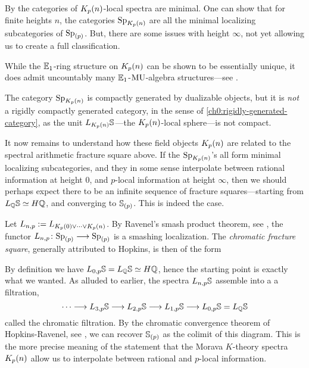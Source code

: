 \begin{remark}
    By \cite[7.5]{hovey-strickland_99} the categories of $\Kpn$-local spectra are minimal. One can show that for finite heights $n$, the categories $\Sp_\Kpn$ are all the minimal localizing subcategories of $\Sp_{(p)}$. But, there are some issues with height $\infty$, not yet allowing us to create a full classification. 
\end{remark}

\begin{remark}
    While the $\E_1$-ring structure on $\Kpn$ can be shown to be essentially unique, it does admit uncountably many $\E_1$-$\MU$-algebra structures---see \cite{angeltveit_2011}. 
\end{remark}

\begin{remark}
    \label{ch0:rm:SpKn-not-rigidly-generated}
    The category $\Sp_\Kpn$ is compactly generated by dualizable objects, but it is \emph{not} a rigidly compactly generated category, in the sense of \cref{ch0:rigidly-generated-category}, as the unit $L_{\Kpn}\S$---the $\Kpn$-local sphere---is not compact.  
\end{remark}

It now remains to understand how these field objects $\Kpn$ are related to the spectral arithmetic fracture square above. If the $\Sp_\Kpn$'s all form minimal localizing subcategories, and they in some sense interpolate between rational information at height $0$, and $p$-local information at height $\infty$, then we should perhaps expect there to be an infinite sequence of fracture squares---starting from $L_\Q \S \simeq H\Q$, and converging to $\S_{(p)}$. This is indeed the case. 

\begin{construction}
    \label{ch0:const:chromatic-fracture-square}
    Let $L\np := L_{K_p(0)\vee \cdots \vee \Kpn}$. By Ravenel's smash product theorem, see \cite[7.5.6]{ravenel_92}, the functor $L\np\colon \Sp_{(p)}\longrightarrow \Sp_{(p)}$ is a smashing localization. The \emph{chromatic fracture square}, generally attributed to Hopkins, is then of the form 
    \begin{center}
    \end{center}
    By definition we have $L_{0,p} \S = L_\Q \S \simeq H\Q$, hence the starting point is exactly what we wanted. As alluded to earlier, the spectra $L\np\S$ assemble into a a filtration, 
    \[\cdots \longrightarrow L_{3,p}\S \longrightarrow L_{2,p}\S \longrightarrow L_{1,p}\S \longrightarrow L_{0,p} \S = L_\Q\S\]
    called the chromatic filtration. By the chromatic convergence theorem of Hopkins-Ravenel, see \cite[7.5.7]{ravenel_92}, we can recover $\S_{(p)}$ as the colimit of this diagram. This is the more precise meaning of the statement that the Morava $K$-theory spectra $\Kpn$ allow us to interpolate between rational and $p$-local information. 
\end{construction}

